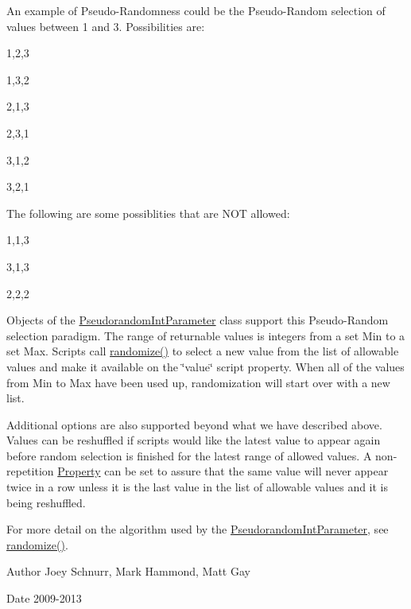 An example of Pseudo-\/\-Randomness could be the Pseudo-\/\-Random selection of values between 1 and 3. Possibilities are\-:
\begin{DoxyItemize}
\item 1,2,3
\item 1,3,2
\item 2,1,3
\item 2,3,1
\item 3,1,2
\item 3,2,1
\end{DoxyItemize}

The following are some possiblities that are N\-O\-T allowed\-:
\begin{DoxyItemize}
\item 1,1,3
\item 3,1,3
\item 2,2,2
\end{DoxyItemize}

Objects of the \hyperlink{class_picto_1_1_pseudorandom_int_parameter}{Pseudorandom\-Int\-Parameter} class support this Pseudo-\/\-Random selection paradigm. The range of returnable values is integers from a set Min to a set Max. Scripts call \hyperlink{class_picto_1_1_pseudorandom_int_parameter_a77d69b74839fc19dd17b3b01b348a2c0}{randomize()} to select a new value from the list of allowable values and make it available on the \char`\"{}value\char`\"{} script property. When all of the values from Min to Max have been used up, randomization will start over with a new list.

Additional options are also supported beyond what we have described above. Values can be reshuffled if scripts would like the latest value to appear again before random selection is finished for the latest range of allowed values. A non-\/repetition \hyperlink{class_picto_1_1_property}{Property} can be set to assure that the same value will never appear twice in a row unless it is the last value in the list of allowable values and it is being reshuffled.

For more detail on the algorithm used by the \hyperlink{class_picto_1_1_pseudorandom_int_parameter}{Pseudorandom\-Int\-Parameter}, see \hyperlink{class_picto_1_1_pseudorandom_int_parameter_a77d69b74839fc19dd17b3b01b348a2c0}{randomize()}.

\begin{DoxyAuthor}{Author}
Joey Schnurr, Mark Hammond, Matt Gay 
\end{DoxyAuthor}
\begin{DoxyDate}{Date}
2009-\/2013 
\end{DoxyDate}


